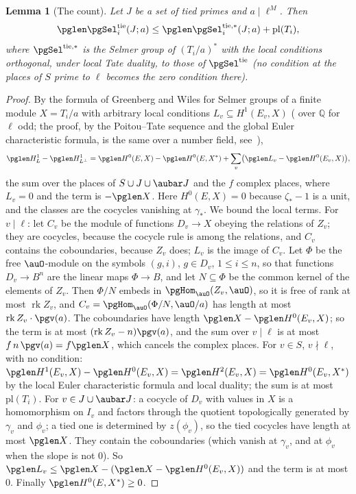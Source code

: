 \documentclass[10pt]{amsart}
\newtheorem{lemma}[theorem]{Lemma}
\theoremstyle{definition}
\theoremstyle{remark}
\newcommand{\Q}{\mathbb Q}
\begin{document}
\begin{lemma}[The count]\label{pg:count}
Let $J$ be a set of tied primes and $a\mid\ell^M$. Then
\[
\pglen\pgSel^{\mathrm{tie}}_i(J;a)\le\pglen\pgSel^{\mathrm{tie},*}_i(J;a)+\mathrm{pl}(T_i),
\]
where $\pgSel^{\mathrm{tie},*}$ is the Selmer group of $(T_i/a)^*$ with the local conditions
orthogonal, under local Tate duality, to those of $\pgSel^{\mathrm{tie}}$ (no condition at the
places of $S$ prime to $\ell$ becomes the zero condition there).
\end{lemma}
\begin{proof}
By the formula of Greenberg and Wiles for Selmer groups of a finite module $X=T_i/a$ with
arbitrary local conditions $L_v\subseteq H^1(E_v,X)$ (\cite[Proposition~1.6]{WilesFLT} over
$\Q$ for $\ell$ odd; the proof, by the Poitou--Tate sequence and the global Euler characteristic formula, is the
same over a number field, see~\cite[Theorem~8.7.9]{NSW}),
\[
\pglen H^1_L-\pglen H^1_{L^\perp}=\pglen H^0(E,X)-\pglen H^0(E,X^*)+\sum_v\bigl(\pglen L_v-\pglen
H^0(E_v,X)\bigr),
\]
the sum over the places of $S\cup J\cup\aubar J$ and the $f$ complex places, where $L_v=0$ and
the term is $-\pglen X$. Here $H^0(E,X)=0$ because $\zeta_*-1$ is a unit, and the classes are
the cocycles vanishing at $\gamma_*$. We bound the local terms. For $v\mid\ell$: let $C_v$ be the
module of functions $D_v\to X$ obeying the relations of $Z_v$; they are cocycles, because the
cocycle rule is among the relations, and $C_v$ contains the coboundaries, because $Z_v$ does; $L_v$
is the image of $C_v$. Let $\Phi$ be the free $\auO$-module on the symbols $(g,i)$, $g\in D_v$,
$1\le i\le n$, so that functions $D_v\to B^n$ are the linear maps $\Phi\to B$, and let
$N\subseteq\Phi$ be the common kernel of the elements of $Z_v$. Then $\Phi/N$ embeds in
$\pgHom_{\auO}(Z_v,\auO)$, so it is free of rank at most $\operatorname{rk}Z_v$, and
$C_v=\pgHom_{\auO}(\Phi/N,\auO/a)$ has length at most $\operatorname{rk}Z_v\cdot\pgv(a)$. The
coboundaries have length $\pglen X-\pglen H^0(E_v,X)$; so the term is at most
$(\operatorname{rk}Z_v-n)\pgv(a)$, and the sum over $v\mid\ell$ is at most $f\,n\,\pgv(a)=f\pglen
X$, which cancels the complex places. For $v\in S$, $v\nmid\ell$, with no condition:
$\pglen H^1(E_v,X)-\pglen H^0(E_v,X)=\pglen H^2(E_v,X)=\pglen H^0(E_v,X^*)$ by the local Euler
characteristic formula and local duality; the sum is at most $\mathrm{pl}(T_i)$. For $v\in
J\cup\aubar J$: a cocycle of $D_v$ with values in $X$ is a homomorphism on $I_v$ and factors
through the quotient topologically generated by $\gamma_v$ and $\phi_v$; a tied one is determined
by $z(\phi_v)$, so the tied cocycles have length at most $\pglen X$. They contain the
coboundaries (which vanish at $\gamma_v$, and at $\phi_v$ when the slope is not $0$). So
$\pglen L_v\le\pglen X-(\pglen X-\pglen H^0(E_v,X))$ and the term is at most $0$. Finally
$\pglen H^0(E,X^*)\ge0$.
\end{proof}
\end{document}
